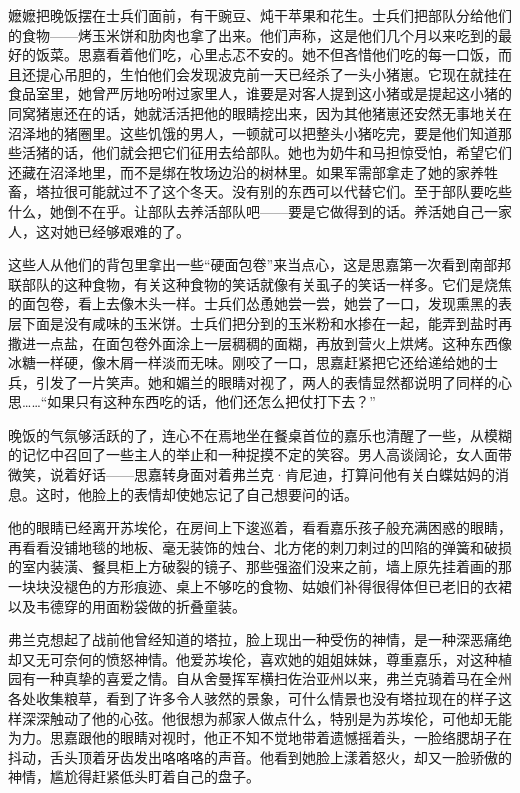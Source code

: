 \par 嬷嬷把晚饭摆在士兵们面前，有干豌豆、炖干苹果和花生。士兵们把部队分给他们的食物——烤玉米饼和肋肉也拿了出来。他们声称，这是他们几个月以来吃到的最好的饭菜。思嘉看着他们吃，心里忐忑不安的。她不但吝惜他们吃的每一口饭，而且还提心吊胆的，生怕他们会发现波克前一天已经杀了一头小猪崽。它现在就挂在食品室里，她曾严厉地吩咐过家里人，谁要是对客人提到这小猪或是提起这小猪的同窝猪崽还在的话，她就活活把他的眼睛挖出来，因为其他猪崽还安然无事地关在沼泽地的猪圈里。这些饥饿的男人，一顿就可以把整头小猪吃完，要是他们知道那些活猪的话，他们就会把它们征用去给部队。她也为奶牛和马担惊受怕，希望它们还藏在沼泽地里，而不是绑在牧场边沿的树林里。如果军需部拿走了她的家养牲畜，塔拉很可能就过不了这个冬天。没有别的东西可以代替它们。至于部队要吃些什么，她倒不在乎。让部队去养活部队吧——要是它做得到的话。养活她自己一家人，这对她已经够艰难的了。
\par 这些人从他们的背包里拿出一些“硬面包卷”来当点心，这是思嘉第一次看到南部邦联部队的这种食物，有关这种食物的笑话就像有关虱子的笑话一样多。它们是烧焦的面包卷，看上去像木头一样。士兵们怂恿她尝一尝，她尝了一口，发现熏黑的表层下面是没有咸味的玉米饼。士兵们把分到的玉米粉和水掺在一起，能弄到盐时再撒进一点盐，在面包卷外面涂上一层稠稠的面糊，再放到营火上烘烤。这种东西像冰糖一样硬，像木屑一样淡而无味。刚咬了一口，思嘉赶紧把它还给递给她的士兵，引发了一片笑声。她和媚兰的眼睛对视了，两人的表情显然都说明了同样的心思……“如果只有这种东西吃的话，他们还怎么把仗打下去？”
\par 晚饭的气氛够活跃的了，连心不在焉地坐在餐桌首位的嘉乐也清醒了一些，从模糊的记忆中召回了一些主人的举止和一种捉摸不定的笑容。男人高谈阔论，女人面带微笑，说着好话——思嘉转身面对着弗兰克·肯尼迪，打算问他有关白蝶姑妈的消息。这时，他脸上的表情却使她忘记了自己想要问的话。
\par 他的眼睛已经离开苏埃伦，在房间上下逡巡着，看看嘉乐孩子般充满困惑的眼睛，再看看没铺地毯的地板、毫无装饰的烛台、北方佬的刺刀刺过的凹陷的弹簧和破损的室内装潢、餐具柜上方破裂的镜子、那些强盗们没来之前，墙上原先挂着画的那一块块没褪色的方形痕迹、桌上不够吃的食物、姑娘们补得很得体但已老旧的衣裙以及韦德穿的用面粉袋做的折叠童装。
\par 弗兰克想起了战前他曾经知道的塔拉，脸上现出一种受伤的神情，是一种深恶痛绝却又无可奈何的愤怒神情。他爱苏埃伦，喜欢她的姐姐妹妹，尊重嘉乐，对这种植园有一种真挚的喜爱之情。自从舍曼挥军横扫佐治亚州以来，弗兰克骑着马在全州各处收集粮草，看到了许多令人骇然的景象，可什么情景也没有塔拉现在的样子这样深深触动了他的心弦。他很想为郝家人做点什么，特别是为苏埃伦，可他却无能为力。思嘉跟他的眼睛对视时，他正不知不觉地带着遗憾摇着头，一脸络腮胡子在抖动，舌头顶着牙齿发出咯咯咯的声音。他看到她脸上漾着怒火，却又一脸骄傲的神情，尴尬得赶紧低头盯着自己的盘子。
